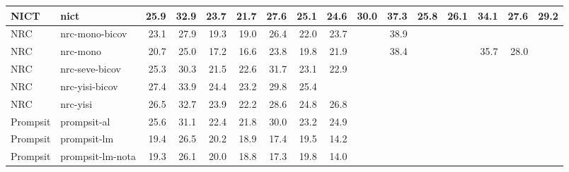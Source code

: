 \begin{table*}
\begin{center}
\begin{tabular}{|l|l|rrrrrrr|rrrrrrr|}
NICT & nict & 25.9 & 32.9 & 23.7 & 21.7 & 27.6 & 25.1 & 24.6 & 30.0 & 37.3 & 25.8 & 26.1 & 34.1 & 27.6 & 29.2 \\ \hline
NRC & nrc-mono-bicov & 23.1 & 27.9 & 19.3 & 19.0 & 26.4 & 22.0 & 23.7 & \cellcolor{lightyellow}{31.6} & 38.9 & \cellcolor{lightgreen}{27.1} & \cellcolor{lightgreen}{28.1} & \cellcolor{lightyellow}{36.0} & \cellcolor{lightgreen}{28.9} & \cellcolor{lightyellow}{30.4} \\ \hline
NRC & nrc-mono & 20.7 & 25.0 & 17.2 & 16.6 & 23.8 & 19.8 & 21.9 & \cellcolor{lightyellow}{31.2} & 38.4 & \cellcolor{lightyellow}{26.8} & \cellcolor{lightyellow}{27.9} & 35.7 & 28.0 & \cellcolor{lightyellow}{30.3} \\ \hline
NRC & nrc-seve-bicov & 25.3 & 30.3 & 21.5 & 22.6 & 31.7 & 23.1 & 22.9 & \cellcolor{lightgreen}{31.7} & \cellcolor{lightyellow}{39.4} & \cellcolor{lightgreen}{27.1} & \cellcolor{lightgreen}{28.3} & \cellcolor{lightgreen}{36.3} & \cellcolor{lightgreen}{28.9} & \cellcolor{lightyellow}{30.1} \\ \hline
NRC & nrc-yisi-bicov & 27.4 & 33.9 & 24.4 & 23.2 & 29.8 & 25.4 & \cellcolor{lightgreen}{27.8} & \cellcolor{lightgreen}{31.9} & \cellcolor{lightgreen}{39.6} & \cellcolor{lightyellow}{26.9} & \cellcolor{green}{28.4} & \cellcolor{lightgreen}{36.6} & \cellcolor{lightgreen}{29.1} & \cellcolor{lightgreen}{30.7} \\ \hline
NRC & nrc-yisi & 26.5 & 32.7 & 23.9 & 22.2 & 28.6 & 24.8 & 26.8 & \cellcolor{lightgreen}{31.8} & \cellcolor{lightyellow}{39.3} & \cellcolor{lightgreen}{27.1} & \cellcolor{lightyellow}{27.9} & \cellcolor{lightgreen}{36.3} & \cellcolor{lightgreen}{29.0} & \cellcolor{green}{30.9} \\ \hline
Prompsit & prompsit-al & 25.6 & 31.1 & 22.4 & 21.8 & 30.0 & 23.2 & 24.9 & \cellcolor{lightgreen}{31.7} & \cellcolor{lightyellow}{39.4} & \cellcolor{lightgreen}{27.0} & \cellcolor{lightgreen}{28.1} & \cellcolor{lightgreen}{36.6} & \cellcolor{lightyellow}{28.6} & \cellcolor{lightgreen}{30.6} \\ \hline
Prompsit & prompsit-lm & 19.4 & 26.5 & 20.2 & 18.9 & 17.4 & 19.5 & 14.2 & \cellcolor{lightgreen}{31.8} & \cellcolor{lightgreen}{39.5} & \cellcolor{lightgreen}{27.3} & \cellcolor{green}{28.4} & \cellcolor{lightgreen}{36.6} & \cellcolor{lightgreen}{28.9} & \cellcolor{lightyellow}{30.4} \\ \hline
Prompsit & prompsit-lm-nota & 19.3 & 26.1 & 20.0 & 18.8 & 17.3 & 19.8 & 14.0 & \cellcolor{lightgreen}{31.7} & \cellcolor{lightgreen}{39.8} & \cellcolor{lightyellow}{26.7} & \cellcolor{lightgreen}{28.3} & \cellcolor{lightgreen}{36.4} & \cellcolor{lightgreen}{29.1} & \cellcolor{lightyellow}{30.0} \\ \hline

\end{tabular}
\end{center}
\end{table*}
